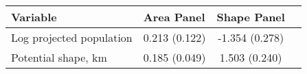 \begin{tabular}{llcr}
\toprule
Variable & Area Panel & Shape Panel \\
\midrule
Log projected population & 0.213 (0.122) & -1.354 (0.278) \\
Potential shape, km & 0.185 (0.049) & 1.503 (0.240) \\
\bottomrule
\end{tabular}
